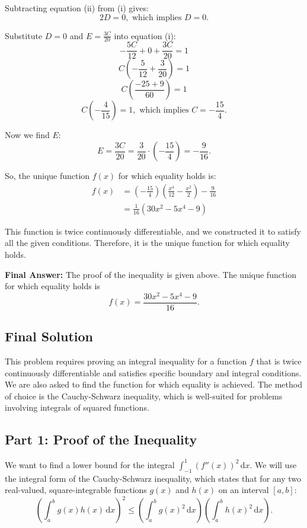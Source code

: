 \documentclass[12pt,a4paper]{article}
\theoremstyle{definition}
\begin{document}
Subtracting equation (ii) from (i) gives:
\[
2D = 0, \text{ which implies } D = 0.
\]

Substitute $D=0$ and $E=\frac{3C}{20}$ into equation (i):
\[
-\frac{5C}{12} + 0 + \frac{3C}{20} = 1
\]
\[
C\left(-\frac{5}{12} + \frac{3}{20}\right) = 1
\]
\[
C\left(\frac{-25 + 9}{60}\right) = 1
\]
\[
C\left(-\frac{4}{15}\right) = 1, \text{ which implies } C = -\frac{15}{4}.
\]

Now we find $E$:
\[
E = \frac{3C}{20} = \frac{3}{20} \cdot \left(-\frac{15}{4}\right) = -\frac{9}{16}.
\]

So, the unique function $f(x)$ for which equality holds is:
\begin{align}
f(x) &= \left(-\frac{15}{4}\right)\left(\frac{x^4}{12} - \frac{x^2}{2}\right) - \frac{9}{16} \\
&= \frac{1}{16}(30x^2 - 5x^4 - 9)
\end{align}

This function is twice continuously differentiable, and we constructed it to satisfy all the given conditions. Therefore, it is the unique function for which equality holds.

\textbf{Final Answer:} The proof of the inequality is given above. The unique function for which equality holds is
\[
f(x) = \frac{30x^2 - 5x^4 - 9}{16}.
\]

\subsection{Final Solution}
This problem requires proving an integral inequality for a function $f$ that is twice continuously differentiable and satisfies specific boundary and integral conditions. We are also asked to find the function for which equality is achieved. The method of choice is the Cauchy-Schwarz inequality, which is well-suited for problems involving integrals of squared functions.

\subsection*{Part 1: Proof of the Inequality}

We want to find a lower bound for the integral $\int_{-1}^{1} (f''(x))^2 \,\mathrm{d}x$. We will use the integral form of the Cauchy-Schwarz inequality, which states that for any two real-valued, square-integrable functions $g(x)$ and $h(x)$ on an interval $[a, b]$:
\[ \left(\int_a^b g(x)h(x)\,\mathrm{d}x\right)^2 \le \left(\int_a^b g(x)^2\,\mathrm{d}x\right) \left(\int_a^b h(x)^2\,\mathrm{d}x\right). \]
\end{document}
